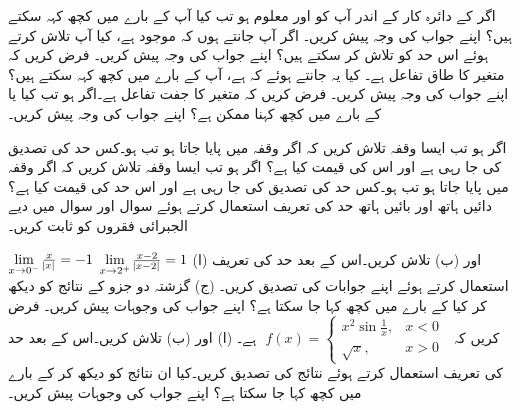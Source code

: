 اگر  کے دائرہ کار کے اندر آپ کو  اور  معلوم ہو تب کیا آپ   کے بارے میں کچھ کہہ سکتے ہیں؟ اپنے جواب کی وجہ پیش کریں۔
اگر آپ جانتے ہوں کہ  موجود ہے، کیا آپ   تلاش کرتے ہوئے اس حد کو تلاش کر سکتے ہیں؟ اپنے جواب کی وجہ پیش کریں۔
فرض کریں کہ  متغیر  کا طاق تفاعل ہے۔ کیا یہ جانتے ہوئے کہ  ہے، آپ   کے بارے میں کچھ کہہ سکتے ہیں؟ اپنے جواب کی وجہ پیش کریں۔
فرض کریں کہ  متغیر  کا جفت تفاعل ہے۔اگر  ہو تب کیا  یا
   کے بارے میں کچھ کہنا ممکن ہے؟ اپنے جواب کی وجہ پیش کریں۔

اگر  ہو تب ایسا وقفہ  تلاش کریں کہ اگر  وقفہ  میں پایا جاتا ہو تب  ہو۔کس حد کی تصدیق کی جا رہی ہے اور اس کی قیمت کیا ہے؟ 
اگر  ہو تب ایسا وقفہ  تلاش کریں کہ اگر  وقفہ  میں پایا جاتا ہو تب  ہو۔کس حد کی تصدیق کی جا رہی ہے اور اس حد کی قیمت کیا ہے؟
دائیں ہاتھ اور بائیں ہاتھ حد کی تعریف استعمال کرتے ہوئے سوال  اور سوال  میں دیے الجبرائی فقروں کو ثابت کریں۔

$\lim\limits_{x\to 0^-}\tfrac{x}{\abs{x}}=-1$
$\lim\limits_{x\to 2^+}\tfrac{x-2}{\abs{x-2}}=1$
(ا)  اور (ب)  تلاش کریں۔اس کے بعد حد کی تعریف استعمال کرتے ہوئے اپنے جوابات کی تصدیق کریں۔ (ج) گزشتہ دو جزو کے نتائج کو دیکھ کر کیا  کے بارے میں کچھ کہا جا سکتا ہے؟ اپنے جواب کی وجوہات پیش کریں۔
فرض کریں کہ 
$\,\,f(x)=\begin{cases}x^2\sin\tfrac{1}{x},&x<0\\ \sqrt{x},&x>0  \,\, \end{cases}$
ہے۔ (ا)  اور (ب)  تلاش کریں۔اس کے بعد حد کی تعریف استعمال کرتے ہوئے نتائج کی تصدیق کریں۔کیا ان نتائج کو دیکھ کر  کے بارے میں کچھ کہا جا سکتا ہے؟ اپنے جواب کی وجوہات  پیش کریں۔

